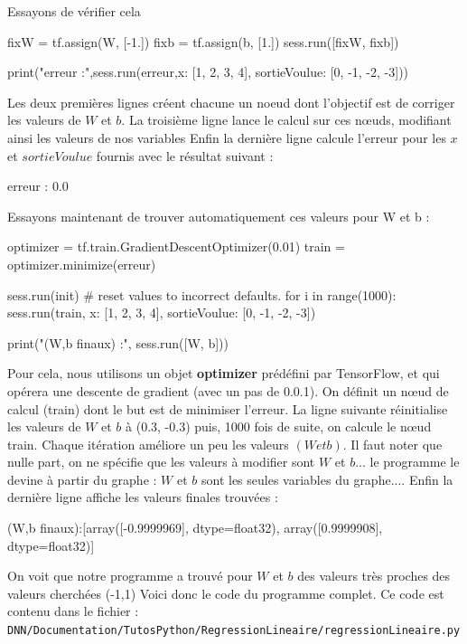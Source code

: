 \documentclass[a4paper,11pt]{book}
\begin{document}
Essayons de vérifier cela 
\begin{mypython}
fixW = tf.assign(W, [-1.])
fixb = tf.assign(b, [1.])
sess.run([fixW, fixb])

print("erreur :",sess.run(erreur,{x: [1, 2, 3, 4], sortieVoulue: [0, -1, -2, -3]}))
\end{mypython}
Les deux premières lignes créent chacune un noeud dont l'objectif est de corriger les valeurs de $W$ et $b$. La troisième ligne lance le calcul sur ces nœuds, modifiant ainsi les valeurs de nos variables
Enfin la dernière ligne calcule l'erreur pour les $x$ et $sortieVoulue$ fournis avec le résultat suivant :
\begin{myoutput}
erreur : 0.0
\end{myoutput}
Essayons maintenant de trouver automatiquement ces valeurs pour W et b :
\begin{mypython}
optimizer = tf.train.GradientDescentOptimizer(0.01)
train = optimizer.minimize(erreur)

sess.run(init) # reset values to incorrect defaults.
for i in range(1000):
  sess.run(train, {x: [1, 2, 3, 4], sortieVoulue: [0, -1, -2, -3]})

print("(W,b finaux) :", sess.run([W, b]))
\end{mypython}
Pour cela, nous utilisons un objet \textbf{optimizer} prédéfini par TensorFlow, et qui opérera une descente de gradient (avec un pas de 0.0.1). On définit un nœud de calcul (train) dont le but est de minimiser  l'erreur.
La ligne suivante réinitialise les valeurs de $W$ et $b$ à (0.3, -0.3)
puis, 1000 fois de suite, on calcule le nœud train. Chaque itération améliore un peu les valeurs $(W et b)$. Il faut noter que nulle part, on ne spécifie que les valeurs à modifier sont $W$ et $b$... le programme le devine à partir du graphe : $W$ et $b$ sont les seules variables du graphe....
Enfin la dernière ligne affiche les valeurs finales trouvées :
\begin{myoutput}
(W,b finaux):[array([-0.9999969], dtype=float32), array([0.9999908], dtype=float32)]
\end{myoutput}

On voit que notre programme a trouvé pour $W$ et $b$ des valeurs très proches des valeurs cherchées (-1,1)
Voici donc le code du programme complet. Ce code est contenu dans le fichier :\\
\verb+DNN/Documentation/TutosPython/RegressionLineaire/regressionLineaire.py+


\end{document}
